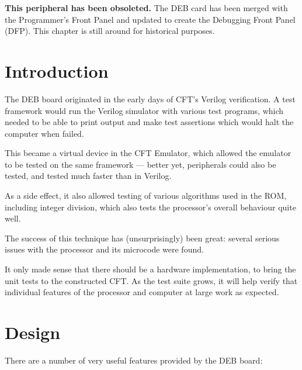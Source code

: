 
\label{chap:deb}

\begin{obsoleted}
\textbf{This peripheral has been obsoleted.} The DEB card has been merged
with the Programmer's Front Panel and updated to create the Debugging
Front Panel (DFP). This chapter is still around for historical purposes.
\end{obsoleted}

\section{Introduction}

The \gls{DEB} board originated in the early days of CFT's
\gls{Verilog} verification. A test framework would run the Verilog
simulator with various test programs, which needed to be able to print
output and make test assertions which would halt the computer when
failed.

This became a virtual device in the CFT Emulator, which allowed the
emulator to be tested on the same framework — better yet, peripherals
could also be tested, and tested much faster than in Verilog.

As a side effect, it also allowed testing of various algorithms used
in the ROM, including integer division, which also tests the
processor's overall behaviour quite well.

The success of this technique has (unsurprisingly) been great: several
serious issues with the processor and its microcode were found.

It only made sense that there should be a hardware implementation, to
bring the unit tests to the constructed CFT. As the test suite grows,
it will help verify that individual features of the processor and
computer at large work as expected.

\section{Design}

There are a number of very useful features provided by the \gls{DEB} board:

